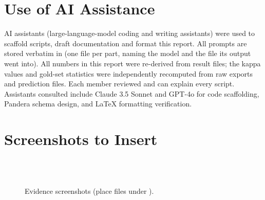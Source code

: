 \documentclass[sigconf,authordraft]{acmart}
\begin{document}
\section{Use of AI Assistance}
AI assistants (large-language-model coding and writing assistants) were used to scaffold scripts, draft documentation and format this report. All prompts are stored verbatim in  (one file per part, naming the model and the file its output went into). All numbers in this report were re-derived from result files; the kappa values and gold-set statistics were independently recomputed from raw exports and prediction files. Each member reviewed and can explain every script. Assistants consulted include Claude 3.5 Sonnet and GPT-4o for code scaffolding, Pandera schema design, and LaTeX formatting verification.

\section{Screenshots to Insert}
\begin{figure}[htbp]\centering
{}\\[3pt]
\\[3pt]
\caption{Evidence screenshots (place files under ).}
\end{figure}
\end{document}

